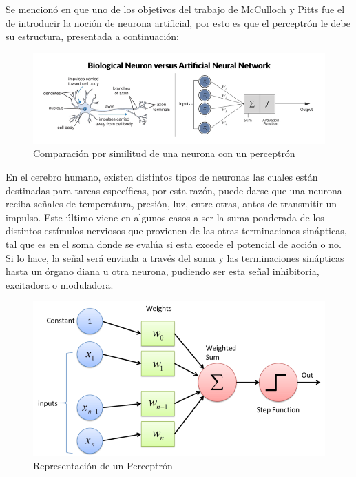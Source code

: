 \begin{itemize}
{\begin{enumerate}
\begin{enumerate}
{             Se mencionó en \cite{29} que uno de los objetivos del trabajo de McCulloch y Pitts fue el de introducir la noción de neurona artificial, por esto es que el perceptrón le debe su estructura, presentada a continuación:
             
            \begin{figure}[h!]
                \centering
                \includegraphics[scale=0.5]{Tesis/images/nn}
                \caption{Comparación por similitud de una neurona con un perceptrón}
                \label{fig:NN}
            \end{figure}
            
            En el cerebro humano, existen distintos tipos de neuronas las cuales están destinadas para tareas específicas, por esta razón, puede darse que una neurona reciba señales de temperatura, presión, luz, entre otras, antes de transmitir un impulso. Este último viene en algunos casos a ser la suma ponderada de los distintos estímulos nerviosos que provienen de las otras terminaciones sinápticas, tal que es en el soma donde se evalúa si esta excede el potencial de acción o no. Si lo hace, la señal será enviada a través del soma y las terminaciones sinápticas hasta un órgano diana u otra neurona, pudiendo ser esta señal inhibitoria, excitadora o moduladora.\\
            
            \begin{figure}
                \centering
                \includegraphics[scale=0.35]{Tesis/images/perceptron}
                \caption{Representación de un Perceptrón}
                \label{fig:Perceptron}
            \end{figure}
            
}
\end{enumerate}
\end{enumerate}}
\end{itemize}
